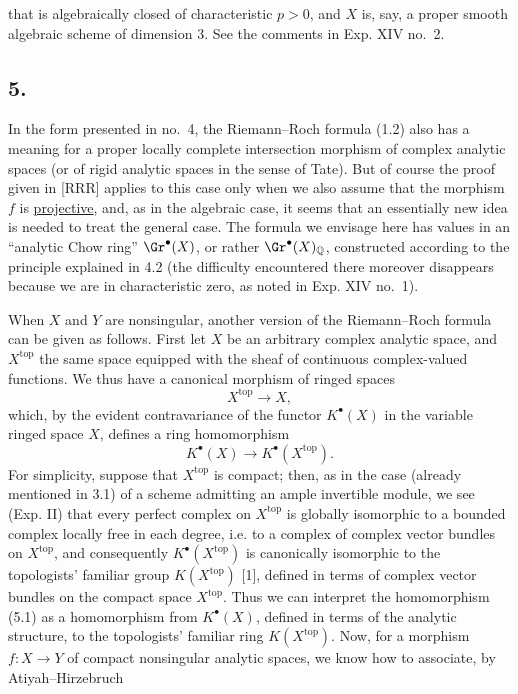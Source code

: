 that is algebraically closed of characteristic $p>0$, and $X$ is, say, a proper smooth algebraic scheme of dimension $3$. See the comments in Exp. XIV no.~2.

\subsection*{5.}
In the form presented in no.~4, the Riemann--Roch formula (1.2) also has a meaning for a proper locally complete intersection morphism of complex analytic spaces (or of rigid analytic spaces in the sense of Tate). But of course the proof given in [RRR] applies to this case only when we also assume that the morphism $f$ is \underline{projective}, and, as in the algebraic case, it seems that an essentially new idea is needed to treat the general case. The formula we envisage here has values in an ``analytic Chow ring'' $\Gr^\bullet(X)$, or rather $\Gr^\bullet(X)_{\mathbb Q}$, constructed according to the principle explained in 4.2 (the difficulty encountered there moreover disappears because we are in characteristic zero, as noted in Exp. XIV no.~1).

When $X$ and $Y$ are nonsingular, another version of the Riemann--Roch formula can be given as follows. First let $X$ be an arbitrary complex analytic space, and $X^{\mathrm{top}}$ the same space equipped with the sheaf of continuous complex-valued functions. We thus have a canonical morphism of ringed spaces
\[
X^{\mathrm{top}}\longrightarrow X,
\]
which, by the evident contravariance of the functor $K^\bullet(X)$ in the variable ringed space $X$, defines a ring homomorphism
\begin{equation}\tag{5.1}
K^\bullet(X)\longrightarrow K^\bullet(X^{\mathrm{top}}).
\end{equation}
For simplicity, suppose that $X^{\mathrm{top}}$ is compact; then, as in the case (already mentioned in 3.1) of a scheme admitting an ample invertible module, we see (Exp. II) that every perfect complex on $X^{\mathrm{top}}$ is globally isomorphic to a bounded complex locally free in each degree, i.e. to a complex of complex vector bundles on $X^{\mathrm{top}}$, and consequently $K^\bullet(X^{\mathrm{top}})$ is canonically isomorphic to the topologists' familiar group $K(X^{\mathrm{top}})$ [1], defined in terms of complex vector bundles on the compact space $X^{\mathrm{top}}$. Thus we can interpret the homomorphism (5.1) as a homomorphism from $K^\bullet(X)$, defined in terms of the analytic structure, to the topologists' familiar ring $K(X^{\mathrm{top}})$. Now, for a morphism $f:X\longrightarrow Y$ of compact nonsingular analytic spaces, we know how to associate, by Atiyah--Hirzebruch

